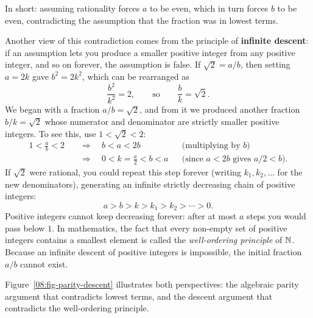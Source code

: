 In short: assuming rationality forces $a$ to be even, which in turn forces $b$ to be even, contradicting the assumption that the fraction was in lowest terms.

Another view of this contradiction comes from the principle of \textbf{infinite descent}: if an assumption lets you produce a smaller positive integer from any positive integer, and so on forever, the assumption is false. If $\sqrt{2} = a/b$, then setting $a = 2k$ gave $b^2 = 2k^2$, which can be rearranged as
\[
\frac{b^2}{k^2} = 2, \qquad\text{so}\qquad \frac{b}{k} = \sqrt{2}.
\]
We began with a fraction $a/b = \sqrt{2}$, and from it we produced another fraction $b/k = \sqrt{2}$ whose numerator and denominator are strictly smaller positive integers. To see this, use $1 < \sqrt{2} < 2$:
\begin{align*}
1 < \frac{a}{b} < 2 \quad &\Longrightarrow \quad b < a < 2b && \text{(multiplying by } b\text{)} \\
&\Longrightarrow \quad 0 < k = \frac{a}{2} < b < a && \text{(since } a < 2b \text{ gives } a/2 < b\text{)}.
\end{align*}
If $\sqrt{2}$ were rational, you could repeat this step forever (writing $k_1, k_2, \ldots$ for the new denominators), generating an infinite strictly decreasing chain of positive integers:
\[
a > b > k > k_1 > k_2 > \cdots > 0.
\]
Positive integers cannot keep decreasing forever: after at most $a$ steps you would pass below $1$. In mathematics, the fact that every non-empty set of positive integers contains a smallest element is called the \emph{well-ordering principle} of $\mathbb{N}$. Because an infinite descent of positive integers is impossible, the initial fraction $a/b$ cannot exist.

Figure~\ref{08:fig-parity-descent} illustrates both perspectives: the algebraic parity argument that contradicts lowest terms, and the descent argument that contradicts the well-ordering principle.

